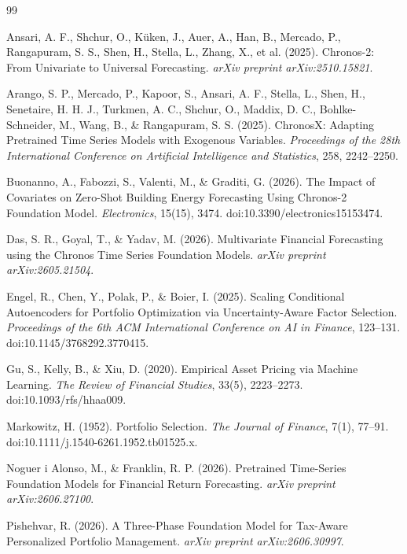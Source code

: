 \documentclass[12pt,a4paper,twoside,openany]{book}
\begin{document}
\begin{thebibliography}{99}

Ansari, A. F., Shchur, O., K{\"u}ken, J., Auer, A., Han, B.,
Mercado, P., Rangapuram, S. S., Shen, H., Stella, L., Zhang, X.,
et al. (2025).
Chronos-2: From Univariate to Universal Forecasting.
\textit{arXiv preprint arXiv:2510.15821}.

Arango, S. P., Mercado, P., Kapoor, S., Ansari, A. F., Stella, L.,
Shen, H., Senetaire, H. H. J., Turkmen, A. C., Shchur, O.,
Maddix, D. C., Bohlke-Schneider, M., Wang, B., \&
Rangapuram, S. S. (2025).
ChronosX: Adapting Pretrained Time Series Models with
Exogenous Variables.
\textit{Proceedings of the 28th International Conference on
Artificial Intelligence and Statistics}, 258, 2242--2250.

Buonanno, A., Fabozzi, S., Valenti, M., \& Graditi, G. (2026).
The Impact of Covariates on Zero-Shot Building Energy Forecasting
Using Chronos-2 Foundation Model.
\textit{Electronics}, 15(15), 3474.
doi:10.3390/electronics15153474.

Das, S. R., Goyal, T., \& Yadav, M. (2026).
Multivariate Financial Forecasting using the Chronos Time Series
Foundation Models.
\textit{arXiv preprint arXiv:2605.21504}.

Engel, R., Chen, Y., Polak, P., \& Boier, I. (2025).
Scaling Conditional Autoencoders for Portfolio Optimization via
Uncertainty-Aware Factor Selection.
\textit{Proceedings of the 6th ACM International Conference on
AI in Finance}, 123--131.
doi:10.1145/3768292.3770415.

Gu, S., Kelly, B., \& Xiu, D. (2020).
Empirical Asset Pricing via Machine Learning.
\textit{The Review of Financial Studies}, 33(5), 2223--2273.
doi:10.1093/rfs/hhaa009.

Markowitz, H. (1952).
Portfolio Selection.
\textit{The Journal of Finance}, 7(1), 77--91.
doi:10.1111/j.1540-6261.1952.tb01525.x.

Noguer i Alonso, M., \& Franklin, R. P. (2026).
Pretrained Time-Series Foundation Models for Financial Return
Forecasting.
\textit{arXiv preprint arXiv:2606.27100}.

Pishehvar, R. (2026).
A Three-Phase Foundation Model for Tax-Aware Personalized
Portfolio Management.
\textit{arXiv preprint arXiv:2606.30997}.


\end{thebibliography}
\end{document}

